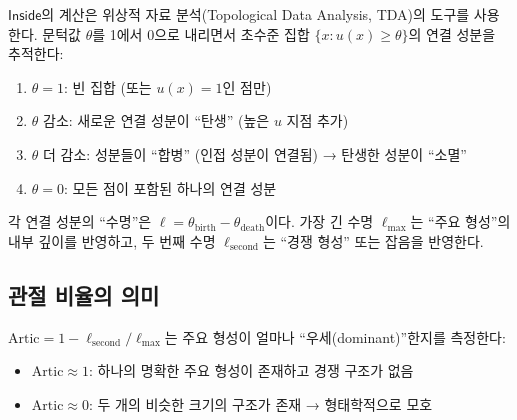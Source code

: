 $\mathsf{Inside}$의 계산은 위상적 자료 분석(Topological Data Analysis, TDA)의 도구를 사용한다. 문턱값 $\theta$를 1에서 0으로 내리면서 초수준 집합 $\{x : u(x) \geq \theta\}$의 연결 성분을 추적한다:

\begin{enumerate}
    \item $\theta = 1$: 빈 집합 (또는 $u(x) = 1$인 점만)
    \item $\theta$ 감소: 새로운 연결 성분이 ``탄생'' (높은 $u$ 지점 추가)
    \item $\theta$ 더 감소: 성분들이 ``합병'' (인접 성분이 연결됨) → 탄생한 성분이 ``소멸''
    \item $\theta = 0$: 모든 점이 포함된 하나의 연결 성분
\end{enumerate}

각 연결 성분의 ``수명''은 $\ell = \theta_{\mathrm{birth}} - \theta_{\mathrm{death}}$이다. 가장 긴 수명 $\ell_{\max}$는 ``주요 형성''의 내부 깊이를 반영하고, 두 번째 수명 $\ell_{\mathrm{second}}$는 ``경쟁 형성'' 또는 잡음을 반영한다.

\subsection{관절 비율의 의미}

$\mathrm{Artic} = 1 - \ell_{\mathrm{second}}/\ell_{\max}$는 주요 형성이 얼마나 ``우세(dominant)''한지를 측정한다:
\begin{itemize}
    \item $\mathrm{Artic} \approx 1$: 하나의 명확한 주요 형성이 존재하고 경쟁 구조가 없음
    \item $\mathrm{Artic} \approx 0$: 두 개의 비슷한 크기의 구조가 존재 → 형태학적으로 모호
\end{itemize}

